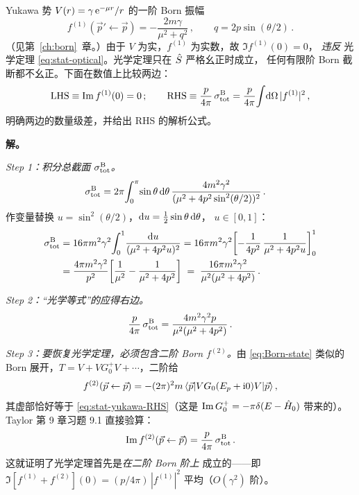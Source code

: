 \begin{example}\label{ex:yukawa-optical}
Yukawa 势 $V(r) = \gamma\,\mathrm{e}^{-\mu r}/r$ 的一阶 Born 振幅
\begin{equation}
  f^{(1)}(\vec p'\leftarrow\vec p)
  = -\frac{2m\gamma}{\mu^2 + q^2}\,,
  \qquad q = 2p\sin(\theta/2)\,.
  \label{eq:stat-yukawa-fb}
\end{equation}
（见第~\ref{ch:born}~章。）由于 $V$ 为实，$f^{(1)}$ 为实数，故 $\Im f^{(1)}(0)=0$，
\emph{违反} 光学定理 \eqref{eq:stat-optical}。光学定理只在 $\hat{S}$ 严格幺正时成立，
任何有限阶 Born 截断都不幺正。下面在数值上比较两边：
\begin{equation}
  \mathrm{LHS} \equiv \Im f^{(1)}(0) = 0\,;\qquad
  \mathrm{RHS} \equiv \frac{p}{4\pi}\,\sigma^{\rm B}_{\rm tot}
  = \frac{p}{4\pi}\!\int\!\mathrm{d}\Omega\,|f^{(1)}|^2\,,
\end{equation}
明确两边的数量级差，并给出 RHS 的解析公式。
\end{example}

\textbf{解。}\quad

\emph{Step 1：积分总截面 $\sigma_{\rm tot}^{\rm B}$。}\quad
\begin{align}
  \sigma_{\rm tot}^{\rm B}
  &= 2\pi\!\int_0^\pi\!\sin\theta\,\mathrm{d}\theta\,
     \frac{4 m^2\gamma^2}{(\mu^2+4p^2\sin^2(\theta/2))^2}\,.
\end{align}
作变量替换 $u = \sin^2(\theta/2)$，$\mathrm{d} u = \frac12\sin\theta\,\mathrm{d}\theta$，
$u\in[0,1]$：
\begin{align}
  \sigma_{\rm tot}^{\rm B}
  &= 16\pi m^2\gamma^2\!\int_0^1\!\frac{\mathrm{d} u}{(\mu^2+4p^2 u)^2}
  = 16\pi m^2\gamma^2\!\left[-\frac{1}{4p^2}\,\frac{1}{\mu^2+4p^2 u}\right]_0^1\nonumber\\
  &= \frac{4\pi m^2\gamma^2}{p^2}\!\left[\frac{1}{\mu^2}-\frac{1}{\mu^2+4p^2}\right]
  \;=\; \frac{16\pi m^2\gamma^2}{\mu^2(\mu^2+4p^2)}\,.
  \label{eq:stat-yukawa-sigma}
\end{align}

\emph{Step 2：``光学等式''的应得右边。}\quad
\begin{equation}
  \frac{p}{4\pi}\,\sigma_{\rm tot}^{\rm B}
  = \frac{4 m^2\gamma^2 p}{\mu^2(\mu^2+4p^2)}\,.
  \label{eq:stat-yukawa-RHS}
\end{equation}

\emph{Step 3：要恢复光学定理，必须包含二阶 Born $f^{(2)}$。}\quad 由
\eqref{eq:Born-state} 类似的 Born 展开，$T = V + V G_0^+ V + \cdots$，二阶给
\begin{equation}
  f^{(2)}(\vec p\leftarrow\vec p) = -(2\pi)^2 m\,
  \langle\vec p|V G_0(E_p+\mathrm{i} 0) V|\vec p\rangle\,,
\end{equation}
其虚部恰好等于 \eqref{eq:stat-yukawa-RHS}（这是 $\Im G_0^+ = -\pi\delta(E-\hat{H}_0)$
带来的）。Taylor 第 9 章习题 9.1 直接验算：
\begin{equation}
  \Im f^{(2)}(\vec p\leftarrow\vec p)
  = \frac{p}{4\pi}\,\sigma_{\rm tot}^{\rm B}\,.
  \label{eq:stat-yukawa-Imf2}
\end{equation}
这就证明了光学定理首先是\emph{在二阶 Born 阶上} 成立的——即
$\Im[f^{(1)}+f^{(2)}](0) = (p/4\pi)\,|f^{(1)}|^2$ 平均（$O(\gamma^2)$ 阶）。

